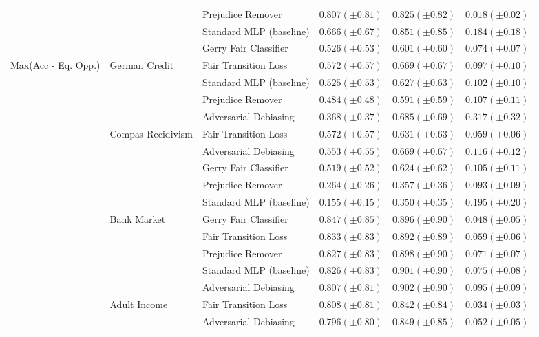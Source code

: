 \begin{tabular}{llllll}
 &  & Prejudice Remover & $0.807 (\pm0.81)$ & $0.825 (\pm0.82)$ & $0.018 (\pm0.02)$ \\
 &  & Standard MLP (baseline) & $0.666 (\pm0.67)$ & $0.851 (\pm0.85)$ & $0.184 (\pm0.18)$ \\
 &  & Gerry Fair Classifier & $0.526 (\pm0.53)$ & $0.601 (\pm0.60)$ & $0.074 (\pm0.07)$ \\
\cline{1-6} \cline{2-6}
\multirow[t]{19}{*}{Max(Acc - Eq. Opp.)} & \multirow[t]{4}{*}{German Credit} & Fair Transition Loss & $0.572 (\pm0.57)$ & $0.669 (\pm0.67)$ & $0.097 (\pm0.10)$ \\
 &  & Standard MLP (baseline) & $0.525 (\pm0.53)$ & $0.627 (\pm0.63)$ & $0.102 (\pm0.10)$ \\
 &  & Prejudice Remover & $0.484 (\pm0.48)$ & $0.591 (\pm0.59)$ & $0.107 (\pm0.11)$ \\
 &  & Adversarial Debiasing & $0.368 (\pm0.37)$ & $0.685 (\pm0.69)$ & $0.317 (\pm0.32)$ \\
\cline{2-6}
 & \multirow[t]{5}{*}{Compas Recidivism} & Fair Transition Loss & $0.572 (\pm0.57)$ & $0.631 (\pm0.63)$ & $0.059 (\pm0.06)$ \\
 &  & Adversarial Debiasing & $0.553 (\pm0.55)$ & $0.669 (\pm0.67)$ & $0.116 (\pm0.12)$ \\
 &  & Gerry Fair Classifier & $0.519 (\pm0.52)$ & $0.624 (\pm0.62)$ & $0.105 (\pm0.11)$ \\
 &  & Prejudice Remover & $0.264 (\pm0.26)$ & $0.357 (\pm0.36)$ & $0.093 (\pm0.09)$ \\
 &  & Standard MLP (baseline) & $0.155 (\pm0.15)$ & $0.350 (\pm0.35)$ & $0.195 (\pm0.20)$ \\
\cline{2-6}
 & \multirow[t]{5}{*}{Bank Market} & Gerry Fair Classifier & $0.847 (\pm0.85)$ & $0.896 (\pm0.90)$ & $0.048 (\pm0.05)$ \\
 &  & Fair Transition Loss & $0.833 (\pm0.83)$ & $0.892 (\pm0.89)$ & $0.059 (\pm0.06)$ \\
 &  & Prejudice Remover & $0.827 (\pm0.83)$ & $0.898 (\pm0.90)$ & $0.071 (\pm0.07)$ \\
 &  & Standard MLP (baseline) & $0.826 (\pm0.83)$ & $0.901 (\pm0.90)$ & $0.075 (\pm0.08)$ \\
 &  & Adversarial Debiasing & $0.807 (\pm0.81)$ & $0.902 (\pm0.90)$ & $0.095 (\pm0.09)$ \\
\cline{2-6}
 & \multirow[t]{5}{*}{Adult Income} & Fair Transition Loss & $0.808 (\pm0.81)$ & $0.842 (\pm0.84)$ & $0.034 (\pm0.03)$ \\
 &  & Adversarial Debiasing & $0.796 (\pm0.80)$ & $0.849 (\pm0.85)$ & $0.052 (\pm0.05)$ \\

\end{tabular}
